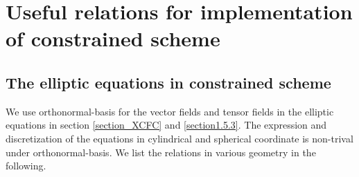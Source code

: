 \chapter{Useful relations for implementation of constrained scheme}
\label{A1}

\section{The elliptic equations in constrained scheme}
We use orthonormal-basis for the vector fields and tensor fields in the elliptic equations in section \ref{section_XCFC} and \ref{section1.5.3}.
The expression and discretization of the equations in cylindrical and spherical coordinate is non-trival under orthonormal-basis.
We list the relations in various geometry in the following.

